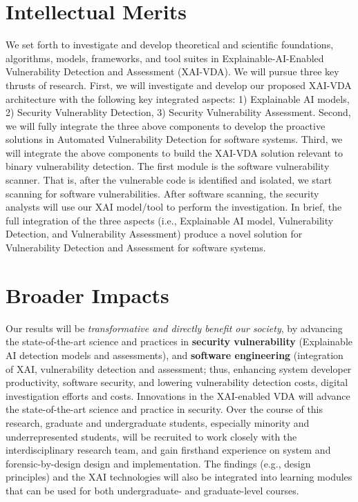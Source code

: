 \documentclass[11pt]{article}
\begin{document}
\section {Intellectual Merits}

We set forth to investigate and develop theoretical and scientific
foundations, algorithms, models, frameworks, and tool suites in
Explainable-AI-Enabled Vulnerability Detection and Assessment
(XAI-VDA). We will pursue three key thrusts of research. First, we
will investigate and develop our proposed XAI-VDA architecture with
the following key integrated aspects: 1) Explainable AI models, 2)
Security Vulnerablity Detection, 3) Security Vulnerability
Assessment. Second, we will fully integrate the three above components
to develop the proactive solutions in Automated Vulnerability
Detection for software systems. Third, we will integrate the above
components to build the XAI-VDA solution relevant to binary
vulnerability detection. The first module is the software
vulnerability scanner.  That is, after the vulnerable code is
identified and isolated, we start scanning for software
vulnerabilities.  After software scanning,
the security analysts will use our XAI model/tool to perform the
investigation. In brief, the full integration of the three aspects
(i.e., Explainable AI model, Vulnerability Detection, and
Vulnerability Assessment) produce a novel solution for Vulnerability
Detection and Assessment for software systems.

\section{Broader Impacts}

Our results will be {\em transformative and directly benefit our
  society}, by advancing the state-of-the-art science and practices in
{\bf security vulnerability} (Explainable AI detection models and
assessments), and {\bf software engineering} (integration of XAI,
vulnerability detection and assessment; thus, enhancing system
developer productivity, software security, and lowering vulnerability
detection costs, digital investigation efforts and costs.  Innovations
in the XAI-enabled VDA will advance the state-of-the-art science and
practice in security. Over the course of this research, graduate and
undergraduate students, especially minority and underrepresented
students, will be recruited to work closely with the interdisciplinary
research team, and gain firsthand experience on system and
forensic-by-design design and implementation. The findings (e.g.,
design principles) and the XAI technologies will also be integrated
into learning modules that can be used for both undergraduate- and
graduate-level courses.
\end{document}
